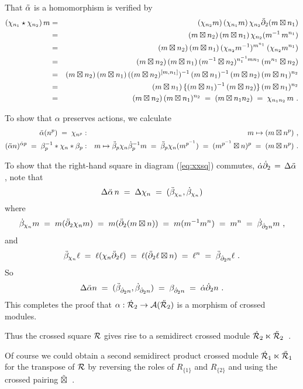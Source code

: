 \begin{pf}
\noindent
That  $\ddot{\alpha}$  is a homomorphism is verified by 
\begin{eqnarray*}
(\chi_{n_1} \star \chi_{n_2})\,m
  & = &  (\chi_{n_2}m)\,(\chi_{n_1}m)\, \chi_{n_2} \ddot{\partial}_2 (m \boxtimes n_1) \\
  & = &  (m \boxtimes n_2)\,(m \boxtimes n_1)\,\chi_{n_2}(m^{-1}\,m^{n_1}) \\
  & = &  (m \boxtimes n_2)\,(m \boxtimes n_1)\,
          (\chi_{n_2}m^{-1})^{m^{n_1}}\,(\chi_{n_2}m^{n_1}) \\
  & = &  (m \boxtimes n_2)\,(m \boxtimes n_1)\,(m^{-1} \boxtimes n_2)^{n_1^{-1}mn_1}\,
           (m^{n_1} \boxtimes n_2) \\
  & = &  (m \boxtimes n_2)\,(m \boxtimes n_1)\,((m \boxtimes n_2)^{[m,n_1]})^{-1}\, 
          (m \boxtimes n_1)^{-1}\,(m \boxtimes n_2)\,(m \boxtimes n_1)^{n_2} \\
  & = &  (m \boxtimes n_1)\,\{(m \boxtimes n_1)^{-1}\,(m \boxtimes n_2)\}\,(m \boxtimes n_1)^{n_2} \\
  & = &  (m \boxtimes n_2)\,(m \boxtimes n_1)^{n_2}
  \;=\;  (m \boxtimes n_1n_2)
  \;=\;  \chi_{n_1n_2}\,m ~.
\end{eqnarray*}

\noindent
To show that  $\alpha$  preserves actions, we calculate
\begin{eqnarray*}
\ddot{\alpha}(n^p) \;=\; \chi_{n^p} 
  & : &  m \mapsto (m \boxtimes n^p) ~, \\
(\ddot{\alpha} n)^{\dot{\alpha} p} 
  \;=\;  \beta_p^{-1} \ast \chi_n \ast \beta_p
  & : &  m \mapsto  \ddot{\beta}_p \chi_n \dot{\beta}_p^{-1} m
  \;=\;  \ddot{\beta}_p \chi_n(m^{p^{-1}})
  \;=\;  (m^{p^{-1}} \boxtimes n)^p
  \;=\;  (m \boxtimes n^p)~.
\end{eqnarray*}

\noindent
To show that the right-hand square in diagram (\ref{eq:xxsq}) commutes,
$\dot{\alpha} \dot{\partial}_2 \,=\, \Delta \ddot{\alpha}\,$,
note that
$$
\Delta \ddot{\alpha} \,n \;=\; \Delta \chi_n \;=\; (\ddot{\beta}_{\chi_n},\dot{\beta}_{\chi_n})
$$
where
$$
\dot{\beta}_{\chi_n}m \;=\; m(\ddot{\partial}_2 \chi_n m) \;=\; m (\ddot{\partial}_2 (m \boxtimes n))
\;=\; m(m^{-1}m^n) \;=\; m^n \;=\; \dot{\beta}_{\dot{\partial}_2 n}m ~,
$$
and
$$
\ddot{\beta}_{\chi_n}\ell \;=\; \ell(\chi_n \ddot{\partial}_2 \ell)
\;=\; \ell(\ddot{\partial}_2 \ell \boxtimes n) \;=\; \ell^n \;=\; \ddot{\beta}_{\dot{\partial}_2 n}\ell ~.
$$
So  
$$
\Delta \ddot{\alpha} n \;=\; (\ddot{\beta}_{\dot{\partial}_2 n}, \dot{\beta}_{\dot{\partial}_2 n}) 
\;=\; \beta_{\dot{\partial}_2 n} \;=\; \dot{\alpha} \dot{\partial}_2 n ~.
$$
This completes the proof that
$\alpha : \dot{\mathcal{R}}_2 \to \mathcal{A}(\ddot{\mathcal{R}}_2)$ is a morphism of crossed modules. 

\medskip\noindent
Thus the crossed square  $\mathcal{R}$
gives rise to a semidirect crossed module
$\dot{\mathcal{R}}_2 \ltimes \ddot{\mathcal{R}}_2$~.

\medskip
Of course we could obtain a second semidirect product crossed module 
$\dot{\mathcal{R}}_1 \ltimes \ddot{\mathcal{R}}_1$  for the transpose of  $\mathcal{R}$
by reversing the roles of $R_{\{1\}}$ and $R_{\{2\}}$
and using the crossed pairing  $\tilde{\boxtimes}$~.


\end{pf}
